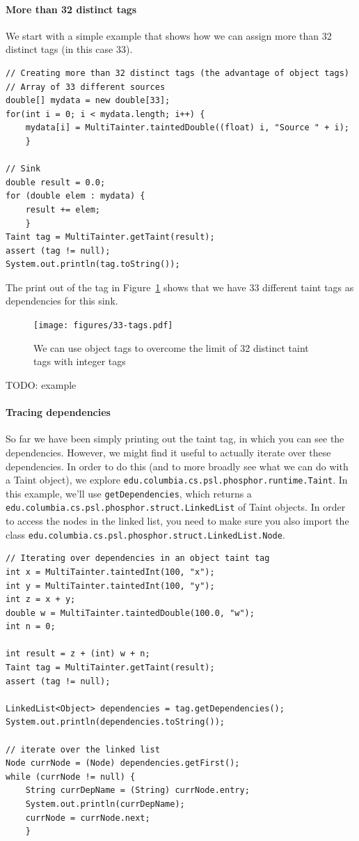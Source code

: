 \documentclass[a4paper]{article}
\newcommand{\todo}[1]{{\color{red}TODO: #1\\}}
\begin{document}
\paragraph{More than 32 distinct tags}
We start with a simple example that shows how we can assign more than 32 distinct tags (in this case 33).

\begin{lstlisting}
// Creating more than 32 distinct tags (the advantage of object tags)
// Array of 33 different sources
double[] mydata = new double[33];
for(int i = 0; i < mydata.length; i++) {
    mydata[i] = MultiTainter.taintedDouble((float) i, "Source " + i);
    }
    
// Sink
double result = 0.0;
for (double elem : mydata) {
    result += elem;
    }
Taint tag = MultiTainter.getTaint(result);
assert (tag != null);
System.out.println(tag.toString());
\end{lstlisting}

The print out of the tag in Figure~\ref{fig:33-tags} shows that we have 33 different taint tags as dependencies for this sink.


\begin{figure}
\texttt{[image: figures/33-tags.pdf]}
\caption{We can use object tags to overcome the limit of 32 distinct taint tags with integer tags}
\label{fig:33-tags}
\end{figure}

\todo{example}
 
\paragraph{Tracing dependencies}
So far we have been simply printing out the taint tag, in which you can see the dependencies.
However, we might find it useful to actually iterate over these dependencies.
In order to do this (and to more broadly see what we can do with a Taint object),
we explore \verb|edu.columbia.cs.psl.phosphor.runtime.Taint|.
In this example, we'll use \verb|getDependencies|,
which returns a
\verb|edu.columbia.cs.psl.phosphor.struct.LinkedList|
of Taint objects.
In order to access the nodes in the linked list, you need to make sure you also import
the class \verb|edu.columbia.cs.psl.phosphor.struct.LinkedList.Node|.

\begin{lstlisting}
// Iterating over dependencies in an object taint tag
int x = MultiTainter.taintedInt(100, "x");
int y = MultiTainter.taintedInt(100, "y");
int z = x + y;
double w = MultiTainter.taintedDouble(100.0, "w");
int n = 0;

int result = z + (int) w + n;
Taint tag = MultiTainter.getTaint(result);
assert (tag != null);

LinkedList<Object> dependencies = tag.getDependencies();
System.out.println(dependencies.toString());

// iterate over the linked list
Node currNode = (Node) dependencies.getFirst();
while (currNode != null) {
    String currDepName = (String) currNode.entry;
    System.out.println(currDepName);
    currNode = currNode.next;
    }
\end{lstlisting}
\end{document}
